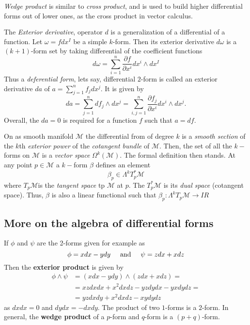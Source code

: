 {    \textit{Wedge product} is similar to \textit{cross product}, and is used to build higher differential forms out of lower ones, as the cross product in vector calculus.
    
    The \textit{Exterior derivative}, operator $d$ is a generalization of a differential of a function. 
    Let $\omega=fdx^I$ be a simple $k$-form. Then its exterior derivative $d\omega$ is a $(k+1)$-form set by taking differential of the coefficient functions
    \begin{equation}
    d\omega = \sum_{i=1}^n \frac{\partial f}{\partial x^i}dx^i \wedge dx^I
    \end{equation}
    Thus a \textit{deferential form}, lets say, differential $2$-form is called an exterior derivative $da$ of $a=\sum_{j=1}^{n}f_j dx^j$. 
    It is given by
    \begin{equation}
    da = \sum_{j=1}^n df_j \wedge dx^j = \sum_{i,j=1}^n \frac{\partial f_j}{\partial x^i}dx^i\wedge dx^j.
    \end{equation}
    Overall, the $da=0$ is required for a function $f$ such that $a=df$.
    
    On as smooth manifold $\mathcal{M}$ the differential from of degree $k$ is a \textit{smooth section} of the $k$th \textit{exterior power} of the \textit{cotangent bundle} of $\mathcal{M}$. 
    Then, the set of all the $k-$forms on $\mathcal{M}$ is a \textit{vector space} $\Omega^k(\mathcal{M})$. 
    The formal definition then stands. At any point $p\in \mathcal{M}$ a $k-$form $\beta$ defines an element 
    \begin{equation}
    \beta_p\in\Lambda^kT^* _p \mathcal{M}
    \end{equation}
    where $T_p\mathcal{M}$is the \textit{tangent space} tp $\mathcal{M}$ at $p$. The $T^* _p \mathcal{M}$ is its \textit{dual space} (cotangent space). Thus, $\beta$ is also a linear functional such that $\beta_p:\Lambda^k T_p \mathcal{M}\rightarrow I\!R$
    
    
    \subsection{More on the algebra of differential forms}
    
    If $\phi$ and $\psi$ are the 2-forms given for example as 
    \begin{equation}
    \phi = x dx - y dy \hspace{5mm} \text{and} \hspace{5mm}\psi = z dx + x dz
    \end{equation}
    Then the \textbf{exterior product} is given by 
    \begin{align}
    \phi\wedge\psi &= (x dx - y dy)\wedge(zdx + xdz) = \\
    &=xzdxdx+x^2dxdz-yzdydx-yxdydz= \\
    &=yzdxdy + x^2 dx dz - xydydz
    \end{align}
    as $dxdx=0$ and $dydx=-dxdy$. 
    The product of two $1$-forms is a $2$-form.
    In general, the \textbf{wedge product} of a $p$-form and $q$-form is a $(p+q)$-form.
    
}
